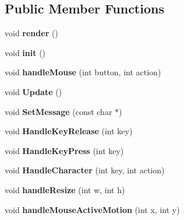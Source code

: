 \subsection*{\-Public \-Member \-Functions}
\begin{DoxyCompactItemize}
\item 
\hypertarget{classgameDialog_a21cedaedca966f952c37ae934b9ce4fa}{void {\bfseries render} ()}\label{classgameDialog_a21cedaedca966f952c37ae934b9ce4fa}

\item 
\hypertarget{classgameDialog_a4a83e9132cfa2201973f5e65ed0f92fc}{void {\bfseries init} ()}\label{classgameDialog_a4a83e9132cfa2201973f5e65ed0f92fc}

\item 
\hypertarget{classgameDialog_a5d6531dc2cfad024519f7725a7ee5c16}{void {\bfseries handle\-Mouse} (int button, int action)}\label{classgameDialog_a5d6531dc2cfad024519f7725a7ee5c16}

\item 
\hypertarget{classgameDialog_a8776daec36b7ff7115c7099dd25cd3e0}{void {\bfseries \-Update} ()}\label{classgameDialog_a8776daec36b7ff7115c7099dd25cd3e0}

\item 
\hypertarget{classgameDialog_aa8d320eca21fe0eb93d7dfed918b73cf}{void {\bfseries \-Set\-Message} (const char $\ast$)}\label{classgameDialog_aa8d320eca21fe0eb93d7dfed918b73cf}

\item 
\hypertarget{classgameDialog_a90c0dcab2347b83964aa424104b7b3bf}{void {\bfseries \-Handle\-Key\-Release} (int key)}\label{classgameDialog_a90c0dcab2347b83964aa424104b7b3bf}

\item 
\hypertarget{classgameDialog_a2ccd78496d884bff62eecda57accfbd2}{void {\bfseries \-Handle\-Key\-Press} (int key)}\label{classgameDialog_a2ccd78496d884bff62eecda57accfbd2}

\item 
\hypertarget{classgameDialog_a4ace469010b65e89c2cb8d7fedcfbbe3}{void {\bfseries \-Handle\-Character} (int key, int action)}\label{classgameDialog_a4ace469010b65e89c2cb8d7fedcfbbe3}

\item 
\hypertarget{classgameDialog_a22384496d1e9d31a02fc8ac2c0c9037c}{void {\bfseries handle\-Resize} (int w, int h)}\label{classgameDialog_a22384496d1e9d31a02fc8ac2c0c9037c}

\item 
\hypertarget{classgameDialog_a70e553f6ff6baace3a4c8f4ba6be0ebd}{void {\bfseries handle\-Mouse\-Active\-Motion} (int x, int y)}\label{classgameDialog_a70e553f6ff6baace3a4c8f4ba6be0ebd}


\end{DoxyCompactItemize}
